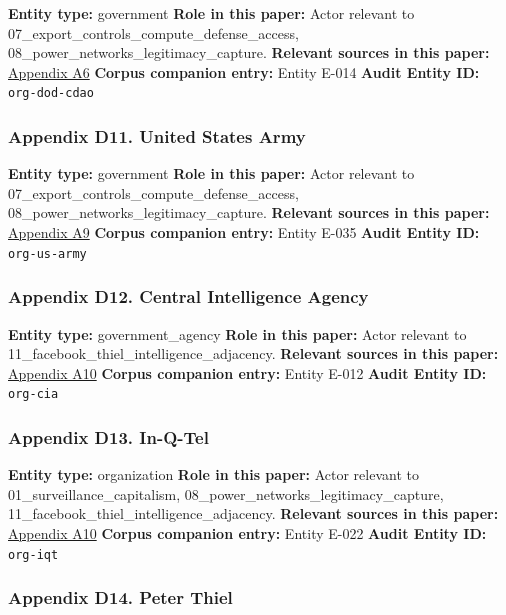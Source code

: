 \documentclass[
  american,
  11pt,
  letterpaper,
]{article}
\begin{document}
\textbf{Entity type:} government \textbf{Role in this paper:} Actor
relevant to 07\_export\_controls\_compute\_defense\_access,
08\_power\_networks\_legitimacy\_capture. \textbf{Relevant sources in
this paper:}
\hyperref[appendix-a6-introducing-openai-for-government]{Appendix A6}
\textbf{Corpus companion entry:} Entity E-014 \textbf{Audit Entity ID:}
\texttt{org-dod-cdao}

\subsubsection{Appendix D11. United States
Army}\label{appendix-d11-united-states-army}

\textbf{Entity type:} government \textbf{Role in this paper:} Actor
relevant to 07\_export\_controls\_compute\_defense\_access,
08\_power\_networks\_legitimacy\_capture. \textbf{Relevant sources in
this paper:}
\hyperref[appendix-a9-army-launches-detachment-201-executive-innovation-corps-to-drive-tech-transformation]{Appendix
A9} \textbf{Corpus companion entry:} Entity E-035 \textbf{Audit Entity
ID:} \texttt{org-us-army}

\subsubsection{Appendix D12. Central Intelligence
Agency}\label{appendix-d12-central-intelligence-agency}

\textbf{Entity type:} government\_agency \textbf{Role in this paper:}
Actor relevant to 11\_facebook\_thiel\_intelligence\_adjacency.
\textbf{Relevant sources in this paper:}
\hyperref[appendix-a10-in-q-tel]{Appendix A10} \textbf{Corpus companion
entry:} Entity E-012 \textbf{Audit Entity ID:} \texttt{org-cia}

\subsubsection{Appendix D13. In-Q-Tel}\label{appendix-d13-in-q-tel}

\textbf{Entity type:} organization \textbf{Role in this paper:} Actor
relevant to 01\_surveillance\_capitalism,
08\_power\_networks\_legitimacy\_capture,
11\_facebook\_thiel\_intelligence\_adjacency. \textbf{Relevant sources
in this paper:} \hyperref[appendix-a10-in-q-tel]{Appendix A10}
\textbf{Corpus companion entry:} Entity E-022 \textbf{Audit Entity ID:}
\texttt{org-iqt}

\subsubsection{Appendix D14. Peter
Thiel}\label{appendix-d14-peter-thiel}
\end{document}

